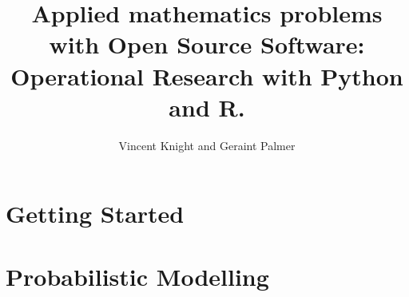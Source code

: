 \documentclass[Alon2,singlecolor,11pt]{Alon}
\title{Applied mathematics problems with Open Source Software:
       Operational Research with Python and R.}
\author{Vincent Knight and Geraint Palmer}
\begin{document}
\frontmatter



\halftitle

\booktitle

\locpage



\cleardoublepage
\setcounter{page}{7} %
\tableofcontents






\mainmatter

\part{Getting Started}




\part{Probabilistic Modelling}






\printindex
\cleardoublepage
\end{document}
